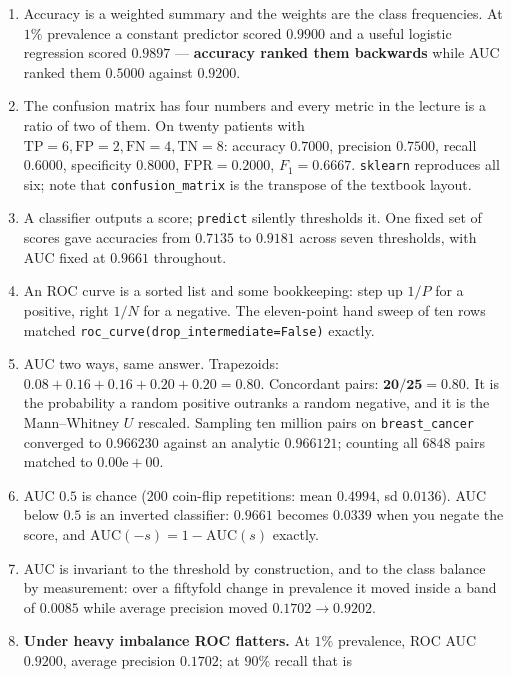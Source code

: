 \documentclass[11pt]{article}
\newcommand{\TP}{\mathrm{TP}}
\newcommand{\FP}{\mathrm{FP}}
\newcommand{\TN}{\mathrm{TN}}
\newcommand{\FN}{\mathrm{FN}}
\newcommand{\FPR}{\mathrm{FPR}}
\begin{document}
\begin{enumerate}[leftmargin=*]
  \item Accuracy is a weighted summary and the weights are the class
    frequencies. At $1\%$ prevalence a constant predictor scored $0.9900$ and a
    useful logistic regression scored $0.9897$ --- \textbf{accuracy ranked them
    backwards} while AUC ranked them $0.5000$ against $0.9200$.
  \item The confusion matrix has four numbers and every metric in the lecture is
    a ratio of two of them. On twenty patients with $\TP = 6, \FP = 2,
    \FN = 4, \TN = 8$: accuracy $0.7000$, precision $0.7500$, recall $0.6000$,
    specificity $0.8000$, $\FPR = 0.2000$, $F_1 = 0.6667$. \texttt{sklearn}
    reproduces all six; note that \texttt{confusion\_matrix} is the transpose of
    the textbook layout.
  \item A classifier outputs a score; \texttt{predict} silently thresholds it.
    One fixed set of scores gave accuracies from $0.7135$ to $0.9181$ across
    seven thresholds, with AUC fixed at $0.9661$ throughout.
  \item An ROC curve is a sorted list and some bookkeeping: step up $1/P$ for a
    positive, right $1/N$ for a negative. The eleven-point hand sweep of ten
    rows matched \texttt{roc\_curve(drop\_intermediate=False)} exactly.
  \item AUC two ways, same answer. Trapezoids: $0.08 + 0.16 + 0.16 + 0.20 +
    0.20 = \mathbf{0.80}$. Concordant pairs: $\mathbf{20/25 = 0.80}$. It is the
    probability a random positive outranks a random negative, and it is the
    Mann--Whitney $U$ rescaled. Sampling ten million pairs on
    \texttt{breast\_cancer} converged to $0.966230$ against an analytic
    $0.966121$; counting all $6848$ pairs matched to $0.00\mathrm{e}{+}00$.
  \item AUC $0.5$ is chance ($200$ coin-flip repetitions: mean $0.4994$, sd
    $0.0136$). AUC below $0.5$ is an inverted classifier: $0.9661$ becomes
    $0.0339$ when you negate the score, and $\mathrm{AUC}(-s) = 1 -
    \mathrm{AUC}(s)$ exactly.
  \item AUC is invariant to the threshold by construction, and to the class
    balance by measurement: over a fiftyfold change in prevalence it moved
    inside a band of $0.0085$ while average precision moved
    $0.1702 \to 0.9202$.
  \item \textbf{Under heavy imbalance ROC flatters.} At $1\%$ prevalence,
    ROC AUC $0.9200$, average precision $0.1702$; at $90\%$ recall that is

\end{enumerate}
\end{document}
